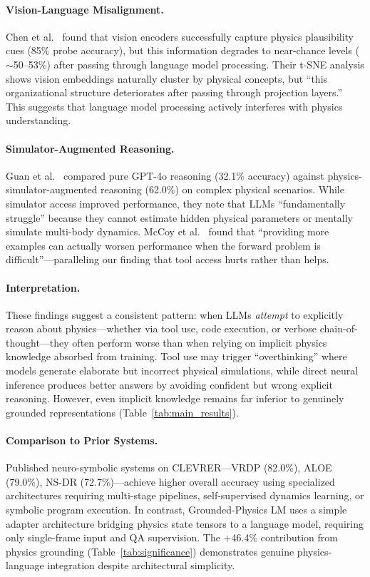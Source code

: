 \documentclass[conference]{IEEEtran}
\theoremstyle{plain}
\theoremstyle{definition}
\theoremstyle{remark}
\begin{document}
\paragraph{Vision-Language Misalignment.} Chen et al.\ \cite{chen2025pixels} found that vision encoders successfully capture physics plausibility cues (85\% probe accuracy), but this information degrades to near-chance levels ($\sim$50--53\%) after passing through language model processing. Their t-SNE analysis shows vision embeddings naturally cluster by physical concepts, but ``this organizational structure deteriorates after passing through projection layers.'' This suggests that language model processing actively interferes with physics understanding.

\paragraph{Simulator-Augmented Reasoning.} Guan et al.\ \cite{guan2024llmphy} compared pure GPT-4o reasoning (32.1\% accuracy) against physics-simulator-augmented reasoning (62.0\%) on complex physical scenarios. While simulator access improved performance, they note that LLMs ``fundamentally struggle'' because they cannot estimate hidden physical parameters or mentally simulate multi-body dynamics. McCoy et al.\ \cite{mccoy2023physics} found that ``providing more examples can actually worsen performance when the forward problem is difficult''---paralleling our finding that tool access hurts rather than helps.

\paragraph{Interpretation.} These findings suggest a consistent pattern: when LLMs \emph{attempt} to explicitly reason about physics---whether via tool use, code execution, or verbose chain-of-thought---they often perform worse than when relying on implicit physics knowledge absorbed from training. Tool use may trigger ``overthinking'' where models generate elaborate but incorrect physical simulations, while direct neural inference produces better answers by avoiding confident but wrong explicit reasoning. However, even implicit knowledge remains far inferior to genuinely grounded representations (Table~\ref{tab:main_results}).

\paragraph{Comparison to Prior Systems.} Published neuro-symbolic systems on CLEVRER---VRDP \cite{ding2021vrdp} (82.0\%), ALOE \cite{ding2021aloe} (79.0\%), NS-DR \cite{yi2020clevrer} (72.7\%)---achieve higher overall accuracy using specialized architectures requiring multi-stage pipelines, self-supervised dynamics learning, or symbolic program execution. In contrast, Grounded-Physics LM uses a simple adapter architecture bridging physics state tensors to a language model, requiring only single-frame input and QA supervision. The +46.4\% contribution from physics grounding (Table~\ref{tab:significance}) demonstrates genuine physics-language integration despite architectural simplicity.
\end{document}
